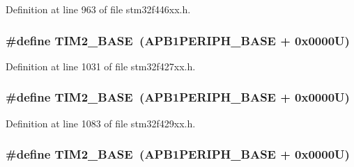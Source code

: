 Definition at line 963 of file stm32f446xx.\+h.

\subsubsection[{\texorpdfstring{T\+I\+M2\+\_\+\+B\+A\+SE}{TIM2_BASE}}]{\setlength{\rightskip}{0pt plus 5cm}\#define T\+I\+M2\+\_\+\+B\+A\+SE~({\bf A\+P\+B1\+P\+E\+R\+I\+P\+H\+\_\+\+B\+A\+SE} + 0x0000\+U)}\hypertarget{group___peripheral__memory__map_ga00d0fe6ad532ab32f0f81cafca8d3aa5}{}\label{group___peripheral__memory__map_ga00d0fe6ad532ab32f0f81cafca8d3aa5}


Definition at line 1031 of file stm32f427xx.\+h.

\subsubsection[{\texorpdfstring{T\+I\+M2\+\_\+\+B\+A\+SE}{TIM2_BASE}}]{\setlength{\rightskip}{0pt plus 5cm}\#define T\+I\+M2\+\_\+\+B\+A\+SE~({\bf A\+P\+B1\+P\+E\+R\+I\+P\+H\+\_\+\+B\+A\+SE} + 0x0000\+U)}\hypertarget{group___peripheral__memory__map_ga00d0fe6ad532ab32f0f81cafca8d3aa5}{}\label{group___peripheral__memory__map_ga00d0fe6ad532ab32f0f81cafca8d3aa5}


Definition at line 1083 of file stm32f429xx.\+h.

\subsubsection[{\texorpdfstring{T\+I\+M2\+\_\+\+B\+A\+SE}{TIM2_BASE}}]{\setlength{\rightskip}{0pt plus 5cm}\#define T\+I\+M2\+\_\+\+B\+A\+SE~({\bf A\+P\+B1\+P\+E\+R\+I\+P\+H\+\_\+\+B\+A\+SE} + 0x0000\+U)}\hypertarget{group___peripheral__memory__map_ga00d0fe6ad532ab32f0f81cafca8d3aa5}{}\label{group___peripheral__memory__map_ga00d0fe6ad532ab32f0f81cafca8d3aa5}


